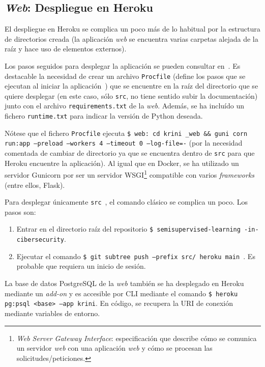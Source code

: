 \subsection{\textit{Web}: Despliegue en Heroku}

El despliegue en Heroku se complica un poco más de lo habitual por la estructura de directorios creada (la aplicación \textit{web} se encuentra varias carpetas alejada de la raíz y hace uso de elementos externos).

Los pasos seguidos para desplegar la aplicación se pueden consultar en~\cite{herokudeploy}. Es destacable la necesidad de crear un archivo \texttt{Procfile} (define los pasos que se ejecutan al iniciar la aplicación~\cite{herokuprocfile}) que se encuentre en la raíz del directorio que se quiere desplegar (en este caso, sólo \texttt{src}, no tiene sentido subir la documentación) junto con el archivo \texttt{requirements.txt} de la \textit{web}. Además, se ha incluído un fichero \texttt{runtime.txt} para indicar la versión de Python deseada.

Nótese que el fichero \texttt{Procfile} ejecuta \texttt{\$ web: cd krini \_web \&\& guni corn run:app --preload --workers 4 --timeout 0 --log-file=-} (por la necesidad comentada de cambiar de directorio ya que se encuentra dentro de \texttt{src} para que Heroku encuentre la aplicación). Al igual que en Docker, se ha utilizado un servidor Gunicorn por ser un servidor WSGI\footnote{\textit{Web Server Gateway Interface}: especificación que describe cómo se comunica un servidor \textit{web} con una aplicación \textit{web} y cómo se procesan las solicitudes/peticiones.} compatible con varios \textit{frameworks} (entre ellos, Flask).

Para desplegar únicamente \texttt{src}~\cite{herokusubtree}, el comando clásico se complica un poco. Los pasos son:

\begin{enumerate}
	\item Entrar en el directorio raíz del repositorio \texttt{\$ semisupervised-learning -in-cibersecurity}.
	\item Ejecutar el comando \texttt{\$ git subtree push --prefix src/ heroku main
	}. Es probable que requiera un inicio de sesión.
\end{enumerate}

La base de datos PostgreSQL de la \textit{web} también se ha desplegado en Heroku mediante un \textit{add-on} y es accesible por CLI mediante el comando \texttt{\$
heroku pg:psql <base> --app krini}. En código, se recupera la URI de conexión mediante variables de entorno.

